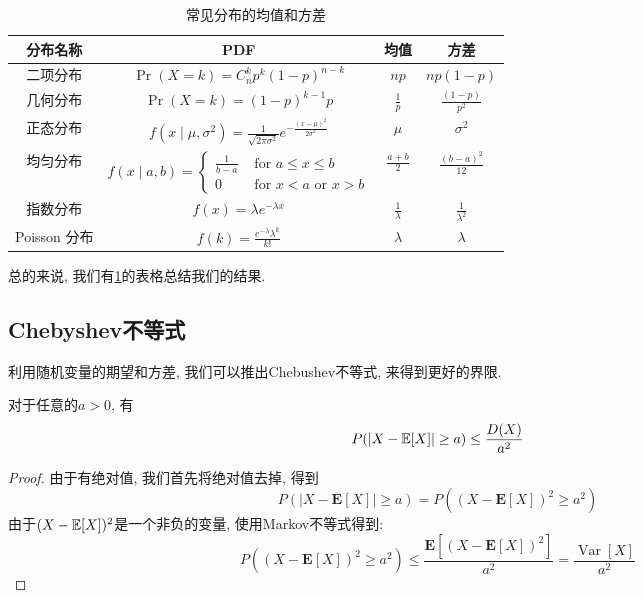 \begin{table}
    \begin{tabular}{|c|c|c|c|}
        \hline 分布名称 & PDF & 均值 & 方差 \\
        \hline 二项分布 & $\operatorname{Pr}(X=k)=C_n^kp^k(1-p)^{n-k}$ & $n p$ & $n p(1-p)$ \\
        \hline 几何分布 & $\operatorname{Pr}(X=k)=(1-p)^{k-1} p$ & $\frac{1}{p}$ & $\frac{(1-p)}{p^2}$ \\
        \hline 正态分布 & $f\left(x \mid \mu, \sigma^2\right)=\frac{1}{\sqrt{2 \pi \sigma^2}} e^{-\frac{(x-\mu)^2}{2 \sigma^2}}$ & $\mu$ & $\sigma^2$ \\
        \hline 均匀分布 & $f(x \mid a, b)= \begin{cases}\frac{1}{b-a} & \text { for } a \leq x \leq b \\
            0 & \text { for } x<a \text { or } x>b\end{cases}$ & $\frac{a+b}{2}$ & $\frac{(b-a)^2}{12}$ \\
            \hline 指数分布 & $f(x )=\lambda e^{-\lambda x}$ & $\frac{1}{\lambda}$ & $\frac{1}{\lambda^2}$ \\
            \hline Poisson 分布 & $f(k )=\frac{e^{-\lambda} \lambda^k}{k !}$ & $\lambda$ & $\lambda$ \\
            \hline
        \end{tabular}
        \caption{常见分布的均值和方差}
        \label{table:mean-var}
\end{table}
总的来说, 我们有\cref{table:mean-var}的表格总结我们的结果. 


\subsection{Chebyshev不等式}

利用随机变量的期望和方差, 我们可以推出Chebushev不等式, 来得到更好的界限. 

\begin{theorem}
    对于任意的$a>0$, 有
    $$
    P(|X-\mathbb E[X]|\geq a)\leq \frac{D(X)}{a^2}
    $$
\end{theorem}

\begin{proof}
    由于有绝对值, 我们首先将绝对值去掉, 得到
    $$
P(|X-\mathbf{E}[X]| \geq a)=P\left((X-\mathbf{E}[X])^2 \geq a^2\right)
$$
由于$(X-\mathbb E[X])^2$是一个非负的变量, 使用Markov不等式得到: 
$$P\left((X-\mathbf{E}[X])^2 \geq a^2\right) \leq \frac{\mathbf{E}\left[(X-\mathbf{E}[X])^2\right]}{a^2}=\frac{\operatorname{Var}[X]}{a^2}$$


\end{proof}


